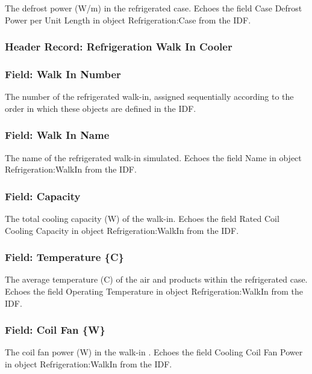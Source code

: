 The defrost power (W/m) in the refrigerated case. Echoes the field Case Defrost Power per Unit Length in object Refrigeration:Case from the IDF.

\subsubsection{Header Record: Refrigeration Walk In Cooler}\label{header-record-refrigeration-walk-in-cooler}

\subsubsection{Field: Walk In Number}\label{field-walk-in-number}

The number of the refrigerated walk-in, assigned sequentially according to the order in which these objects are defined in the IDF.

\subsubsection{Field: Walk In Name}\label{field-walk-in-name}

The name of the refrigerated walk-in simulated. Echoes the field Name in object Refrigeration:WalkIn from the IDF.

\subsubsection{Field: Capacity}\label{field-capacity-1}

The total cooling capacity (W) of the walk-in. Echoes the field Rated Coil Cooling Capacity in object Refrigeration:WalkIn from the IDF.

\subsubsection{Field: Temperature \{C\}}\label{field-temperature-c-1}

The average temperature (C) of the air and products within the refrigerated case. Echoes the field Operating Temperature in object Refrigeration:WalkIn from the IDF.

\subsubsection{Field: Coil Fan \{W\}}\label{field-coil-fan-w}

The coil fan power (W) in the walk-in . Echoes the field Cooling Coil Fan Power in object Refrigeration:WalkIn from the IDF.

